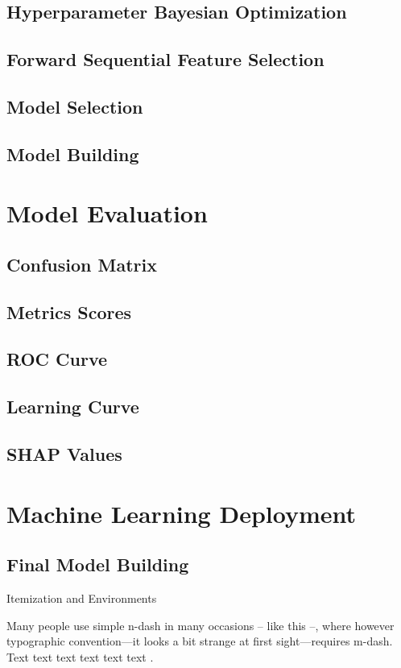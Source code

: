 \subsection{Hyperparameter Bayesian Optimization}
\subsection{Forward Sequential Feature Selection}
\label{subsec:feature-selection}
\subsection{Model Selection}
\subsection{Model Building}
\section{Model Evaluation}
\subsection{Confusion Matrix}
\subsection{Metrics Scores}
\subsection{ROC Curve}
\subsection{Learning Curve}
\subsection{SHAP Values}
\section{Machine Learning Deployment}
\subsection{Final Model Building}


Itemization and Environments

Many people use simple n-dash in many occasions -- like this --, where however typographic convention---it looks a bit strange at first sight---requires m-dash.
Text text text text text text \citet{Haufler2006}. 

